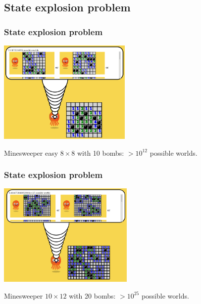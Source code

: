 
\subsection{State explosion problem}

\begin{frame}
\frametitle{State explosion problem}




\begin{center}
	\includegraphics[height=5cm]{images/HW_minesweeper_easy.png}
\end{center}


\begin{example}
	Minesweeper easy $8 \times 8$ with 10 bombs: $> 10^{12}$ possible worlds.
\end{example}
\end{frame}

\begin{frame}
\frametitle{State explosion problem}




\begin{center}
	\includegraphics[height=5cm]{images/hintikkas_world_minesweeper.png}
\end{center}


\begin{example}
	Minesweeper $10 \times 12$ with 20 bombs: $> 10^{25}$ possible worlds.
\end{example}
\end{frame}




